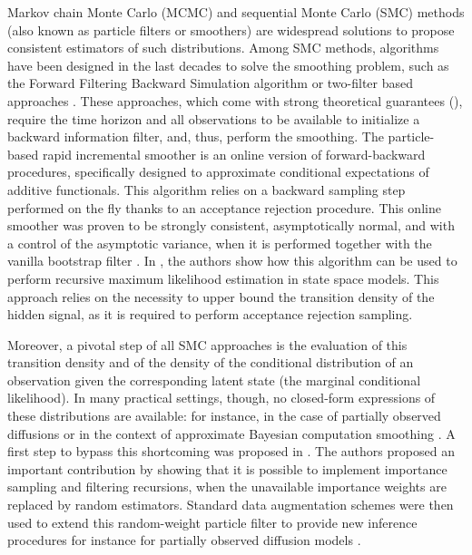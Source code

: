 \documentclass[12pt]{article}
\begin{document}
Markov chain Monte Carlo (MCMC) and sequential Monte Carlo (SMC) methods (also known as particle filters or smoothers) are widespread solutions to propose consistent estimators of such distributions. 
Among SMC methods, algorithms have been designed in the last decades to solve the smoothing problem, such as the Forward Filtering Backward Simulation algorithm \citep{douc2011sequential}  or two-filter based approaches \citep{briers2010smoothing, fearnhead2010sequential, nguyen2017two}. %
These approaches, which come with strong theoretical guarantees (\cite{delmoral2010backward, douc2011sequential, dubarry2013nonasymptotic, gerber2017convergence}), require the time horizon and all observations to be available  to initialize a backward information filter, and, thus, perform the smoothing.
The particle-based rapid incremental smoother \citep{olsson2017efficient} is an online version of forward-backward procedures, specifically designed to approximate conditional expectations of additive functionals. 
This algorithm relies on a backward sampling step performed on the fly thanks to an acceptance rejection procedure. 
This online smoother was proven to be strongly consistent, asymptotically normal, and with a control of the asymptotic variance, when it is performed together with the vanilla bootstrap filter \citep{gordon1993novel}. 
In \cite{olsson2020particle}, the authors show how this algorithm can be used to perform recursive maximum likelihood estimation in state space models. This approach relies on the necessity to upper bound the transition density of the hidden signal, as it is required to perform acceptance rejection sampling.

Moreover, a pivotal step of all SMC approaches is the evaluation of this transition density and of the density of the conditional distribution of an observation given the corresponding latent state (the marginal conditional likelihood).
In many practical settings, though, no closed-form expressions of these distributions are available: for instance, in the case of partially observed diffusions \citep{andersson2017unbiased,fearnhead2017continuous} or in the context of  approximate Bayesian computation smoothing \citep{martin:jasra:singh:whiteley:delmoral:maccoy:2014}.
 A first step to bypass this shortcoming was proposed in  \cite{fearnhead2010random}. %
The authors proposed an important contribution by showing that it is possible to implement importance sampling and filtering recursions, when the unavailable importance weights are replaced by random estimators.
Standard data augmentation schemes were then used to extend this random-weight particle filter to provide new inference procedures for instance for partially observed diffusion models \citep{yonekura:beskos:2020}. 
\end{document}
